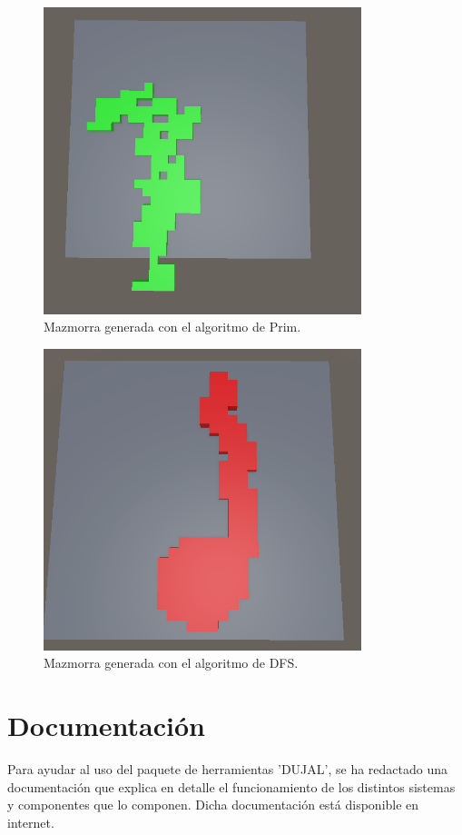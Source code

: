 \begin{figure}[H]
   \centering
     \includegraphics[width=350px,clip=true]{primDungeon.png}
   \caption{Mazmorra generada con el algoritmo de Prim.}
   \label{fig:primDungeon}
 \end{figure}

\begin{figure}[H]
  \centering
    \includegraphics[width=350px,clip=true]{DFSDungeon.png}
  \caption{Mazmorra generada con el algoritmo de DFS.}
  \label{fig:DFSDungeon}
\end{figure}

\section{Documentación}
Para ayudar al uso del paquete de herramientas 'DUJAL', se ha redactado una documentación que explica en detalle el funcionamiento de los distintos sistemas 
y componentes que lo componen. Dicha documentación está disponible en internet\cite{dujalDoc}. 
